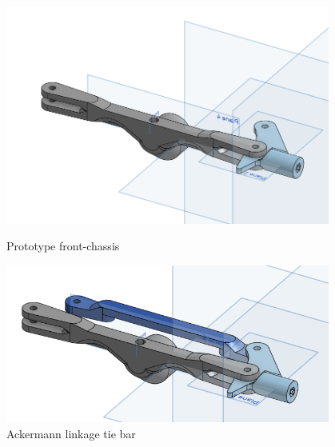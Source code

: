 \begin{figure}[ht]
\begin{minipage}[b]{.48\textwidth}
  \centering
  \includegraphics[width=0.95\textwidth]{Meetings/September/09-28-22/9-28-22_CAD_Figure3.PNG}
  \caption{Prototype front-chassis}
  \label{fig:pic3}
\end{minipage}

\begin{minipage}[b]{.48\textwidth}
  \centering
  \includegraphics[width=0.95\textwidth]{Meetings/September/09-28-22/9-28-22_CAD_Figure4.PNG}
  \caption{Ackermann linkage tie bar}
  \label{fig:pic4}
\end{minipage}
\end{figure}

